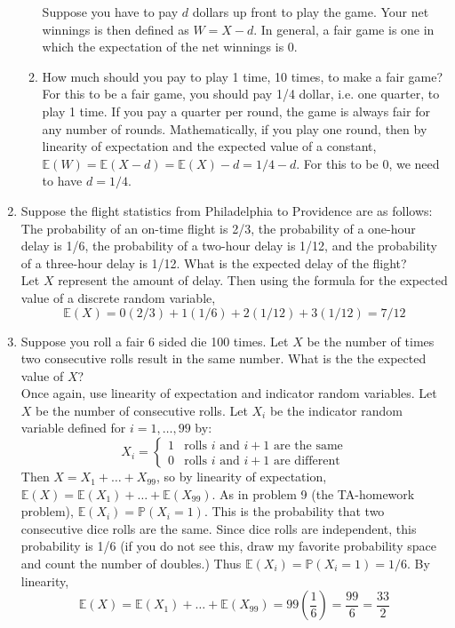 \documentclass[12pt]{article}
\def\P{{\mathbb P}}
\def\E{{\mathbb E}}
\begin{document}
\begin{enumerate}
\begin{enumerate}
Suppose you have to pay $d$ dollars up front to play the game. Your net winnings is then defined as $W = X - d$. In general, a fair game is one in which the expectation of the net winnings is 0.
\item How much should you pay to play 1 time, 10 times, to make a fair game?\\

For this to be a fair game, you should pay 1/4 dollar, i.e. one quarter, to play 1 time. If you pay a quarter per round, the game is always fair for any number of rounds. Mathematically, if you play one round, then by linearity of expectation and the expected value of a constant, $\E(W) = \E(X - d) = \E(X) - d = 1/4 - d$. For this to be 0, we need to have $d = 1/4$.

\end{enumerate}

\item Suppose the flight statistics from Philadelphia to Providence are as follows: The probability of an on-time flight is 2/3, the probability of a one-hour delay is 1/6, the probability of a two-hour delay is 1/12, and the probability of a three-hour delay is 1/12. What is the expected delay of the flight?\\

Let $X$ represent the amount of delay. Then using the formula for the expected value of a discrete random variable,
\[
\E(X) = 0(2/3) + 1(1/6) + 2(1/12) + 3(1/12) = 7/12
\]

\item Suppose you roll a fair 6 sided die 100 times. Let $X$ be the number of times two consecutive rolls result in the same number. What is the the expected value of $X$?\\

Once again, use linearity of expectation and indicator random variables. Let $X$ be the number of consecutive rolls. Let $X_i$ be the indicator random variable defined for $i = 1, \dots, 99$ by:
\[
X_i =\begin{cases}
1 & \text{rolls $i$ and $i+1$ are the same}\\
0 & \text{rolls $i$ and $i+1$ are different}
\end{cases}
\]
Then $X = X_1 + \dots + X_{99}$, so by linearity of expectation, $\E(X) = \E(X_1) + \dots + \E(X_{99})$. As in problem 9 (the TA-homework problem), $\E(X_i) = \P(X_i = 1)$. This is the probability that two consecutive dice rolls are the same. Since dice rolls are independent, this probability is 1/6 (if you do not see this, draw my favorite probability space and count the number of doubles.) Thus $\E(X_i) = \P(X_i = 1) = 1/6$. By linearity,
\[
\E(X) = \E(X_1) + \dots + \E(X_{99}) = 99 \left(\frac{1}{6}\right) = \frac{99}{6} = \frac{33}{2}
\]


\end{enumerate}
\end{document}
